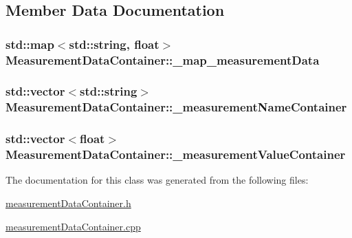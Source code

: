 \subsection{Member Data Documentation}
\hypertarget{classMeasurementDataContainer_afd620c2a3da101266e5738d5a64235b5}{
\subsubsection[{\-\_\-map\-\_\-measurement\-Data}]{\setlength{\rightskip}{0pt plus 5cm}std\-::map$<$std\-::string, float$>$ Measurement\-Data\-Container\-::\-\_\-map\-\_\-measurement\-Data\hspace{0.3cm}{\ttfamily [private]}}}\label{classMeasurementDataContainer_afd620c2a3da101266e5738d5a64235b5}
\hypertarget{classMeasurementDataContainer_aedf6dcab70e753e2ceb7f20a58ae3112}{
\subsubsection[{\-\_\-measurement\-Name\-Container}]{\setlength{\rightskip}{0pt plus 5cm}std\-::vector$<$std\-::string$>$ Measurement\-Data\-Container\-::\-\_\-measurement\-Name\-Container\hspace{0.3cm}{\ttfamily [private]}}}\label{classMeasurementDataContainer_aedf6dcab70e753e2ceb7f20a58ae3112}
\hypertarget{classMeasurementDataContainer_a2795d51b1daf461af38923e1fdc4c444}{
\subsubsection[{\-\_\-measurement\-Value\-Container}]{\setlength{\rightskip}{0pt plus 5cm}std\-::vector$<$float$>$ Measurement\-Data\-Container\-::\-\_\-measurement\-Value\-Container\hspace{0.3cm}{\ttfamily [private]}}}\label{classMeasurementDataContainer_a2795d51b1daf461af38923e1fdc4c444}


The documentation for this class was generated from the following files\-:\begin{DoxyCompactItemize}
\item 
\hyperlink{measurementDataContainer_8h}{measurement\-Data\-Container.\-h}\item 
\hyperlink{measurementDataContainer_8cpp}{measurement\-Data\-Container.\-cpp}\end{DoxyCompactItemize}
